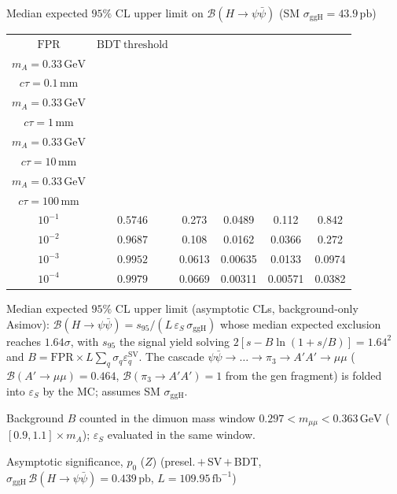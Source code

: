 \documentclass[10pt,a4paper]{article}
\begin{document}
{\vspace{12pt}

Median expected $95\%$ CL upper limit on $\mathcal{B}(H\to\psi\bar{\psi})$ (SM $\sigma_{\mathrm{ggH}}=43.9\,\mathrm{pb}$)

\begin{tabular}{cccccc}
\toprule
$\mathrm{FPR}$ & $\mathrm{BDT\ threshold}$ & \shortstack{$m_{\pi}=1\,\mathrm{GeV}$\\$m_{A}=0.33\,\mathrm{GeV}$\\$c\tau=0.1\,\mathrm{mm}$} & \shortstack{$m_{\pi}=1\,\mathrm{GeV}$\\$m_{A}=0.33\,\mathrm{GeV}$\\$c\tau=1\,\mathrm{mm}$} & \shortstack{$m_{\pi}=1\,\mathrm{GeV}$\\$m_{A}=0.33\,\mathrm{GeV}$\\$c\tau=10\,\mathrm{mm}$} & \shortstack{$m_{\pi}=1\,\mathrm{GeV}$\\$m_{A}=0.33\,\mathrm{GeV}$\\$c\tau=100\,\mathrm{mm}$} \\
\midrule
$10^{-1}$ & $0.5746$ & 0.273 & 0.0489 & 0.112 & 0.842\\
$10^{-2}$ & $0.9687$ & 0.108 & 0.0162 & 0.0366 & 0.272\\
$10^{-3}$ & $0.9952$ & 0.0613 & 0.00635 & 0.0133 & 0.0974\\
$10^{-4}$ & $0.9979$ & 0.0669 & 0.00311 & 0.00571 & 0.0382\\
\bottomrule
\end{tabular}

{\small Median expected $95\%$ CL upper limit (asymptotic CLs, background-only Asimov): $\mathcal{B}(H\to\psi\bar{\psi})=s_{95}/(L\,\varepsilon_S\,\sigma_{\mathrm{ggH}})$ whose median expected exclusion reaches $1.64\sigma$, with $s_{95}$ the signal yield solving $2[s-B\ln(1{+}s/B)]=1.64^2$ and $B=\mathrm{FPR}\times L\sum_q\sigma_q\varepsilon_q^{\mathrm{SV}}$. The cascade $\psi\bar{\psi}\to\ldots\to\pi_3\to A'A'\to\mu\mu$ ($\mathcal{B}(A'\to\mu\mu)=0.464$, $\mathcal{B}(\pi_3\to A'A')=1$ from the gen fragment) is folded into $\varepsilon_S$ by the MC; assumes SM $\sigma_{\mathrm{ggH}}$.}

{\small Background $B$ counted in the dimuon mass window $0.297<m_{\mu\mu}<0.363\,\mathrm{GeV}$ ($[0.9,1.1]\times m_A$); $\varepsilon_S$ evaluated in the same window.}

\vspace{12pt}

Asymptotic significance, $p_0$ ($Z$) (presel.\,$+$\,SV\,$+$\,BDT, $\sigma_{\mathrm{ggH}}\,\mathcal{B}(H\to\psi\bar{\psi})=0.439\,\mathrm{pb}$, $L=109.95\,\mathrm{fb}^{-1}$)

}
\end{document}

